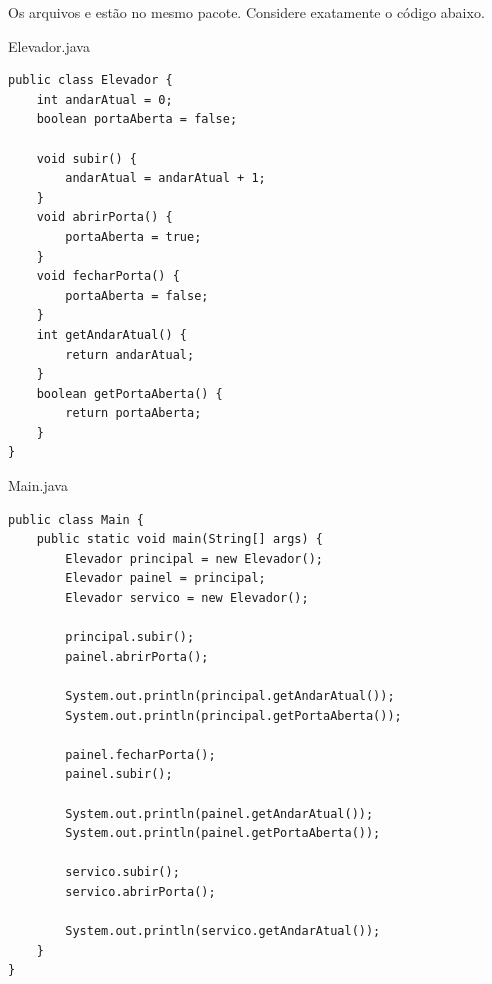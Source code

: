 \documentclass[11pt,a4paper]{article}
\begin{document}
\cabecalhoAvaliacao
\blocoQuadroRespostas
{}
Os arquivos  e  estão no mesmo pacote.
Considere exatamente o código abaixo.

\noindent\begin{minipage}[t]{.37\textwidth}
\vspace{0pt}
\begin{painelreferencia}{Elevador.java}
\begin{lstlisting}[style=cenariocodigo]
public class Elevador {
    int andarAtual = 0;
    boolean portaAberta = false;

    void subir() {
        andarAtual = andarAtual + 1;
    }
    void abrirPorta() {
        portaAberta = true;
    }
    void fecharPorta() {
        portaAberta = false;
    }
    int getAndarAtual() {
        return andarAtual;
    }
    boolean getPortaAberta() {
        return portaAberta;
    }
}
\end{lstlisting}
\end{painelreferencia}
\end{minipage}\hfill
\begin{minipage}[t]{.61\textwidth}
\vspace{0pt}
\begin{painelreferencia}{Main.java}
\begin{lstlisting}[style=cenariocodigo]
public class Main {
    public static void main(String[] args) {
        Elevador principal = new Elevador();
        Elevador painel = principal;
        Elevador servico = new Elevador();

        principal.subir();
        painel.abrirPorta();

        System.out.println(principal.getAndarAtual());
        System.out.println(principal.getPortaAberta());

        painel.fecharPorta();
        painel.subir();

        System.out.println(painel.getAndarAtual());
        System.out.println(painel.getPortaAberta());

        servico.subir();
        servico.abrirPorta();

        System.out.println(servico.getAndarAtual());
    }
}
\end{lstlisting}
\end{painelreferencia}
\end{minipage}
\vspace{-\espacoS}
\inicioQuestoes
\end{document}
